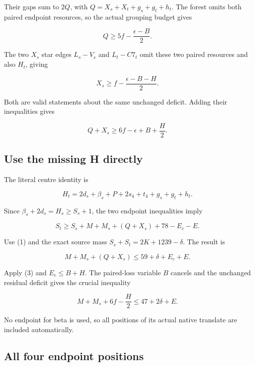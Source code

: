 \documentclass[10pt,a4paper]{article}
\theoremstyle{definition}
\begin{document}
Their gaps sum to \(2Q\),\allowbreak{} with \(Q=\allowbreak{}X_s+\allowbreak{}X_t+\allowbreak{}g_s+\allowbreak{}g_t+\allowbreak{}h_t\). The forest
omits both paired endpoint resources,\allowbreak{} so the actual grouping budget
gives

\[
Q\ge5f-\frac{\epsilon-B}{2}.
\]

The two \(X_s\) star edges \(L_s-V_s\) and \(L_t-C7_t\) omit these two
paired resources and also \(H_t\),\allowbreak{} giving

\[
X_s\ge f-\frac{\epsilon-B-H}{2}.
\]

Both are valid statements about the same unchanged deficit. Adding their
inequalities gives

\[
Q+\allowbreak{}X_s\ge6f-\epsilon+\allowbreak{}B+\allowbreak{}\frac H2.\tag{3}
\]

\hypertarget{use-the-missing-h-directly}{%
\subsection{Use the missing H
directly}\label{use-the-missing-h-directly}}

The literal centre identity is

\[
H_t=\allowbreak{}2d_s+\allowbreak{}\beta_s+\allowbreak{}P+\allowbreak{}2s_4+\allowbreak{}t_4+\allowbreak{}g_s+\allowbreak{}g_t+\allowbreak{}h_t.
\]

Since \(\beta_s+\allowbreak{}2d_s=\allowbreak{}H_s\ge S_s+\allowbreak{}1\),\allowbreak{} the two endpoint inequalities imply

\[
S_t\ge S_s+\allowbreak{}M+\allowbreak{}M_s+\allowbreak{}(Q+\allowbreak{}X_s)+\allowbreak{}78-E_c-E.
\]

Use (1) and the exact source mass \(S_s+\allowbreak{}S_t=\allowbreak{}2K+\allowbreak{}1239-\delta\). The result
is

\[
M+\allowbreak{}M_s+\allowbreak{}(Q+\allowbreak{}X_s)\le59+\allowbreak{}\delta+\allowbreak{}E_c+\allowbreak{}E.
\]

Apply (3) and \(E_c\le B+\allowbreak{}H\). The paired-loss variable \(B\) cancels and
the unchanged residual deficit gives the crucial inequality

\[
M+\allowbreak{}M_s+\allowbreak{}6f-\frac H2\le47+\allowbreak{}2\delta+\allowbreak{}E.\tag{4}
\]

No endpoint for beta is used,\allowbreak{} so all positions of its actual native
translate are included automatically.

\hypertarget{all-four-endpoint-positions}{%
\subsection{All four endpoint
positions}\label{all-four-endpoint-positions}}
\end{document}
